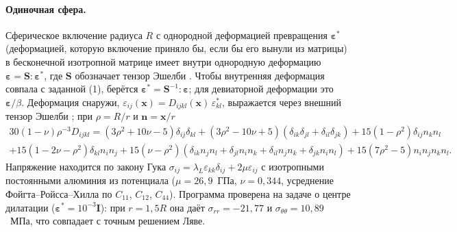 \documentclass[11pt,a4paper]{article}
\begin{document}
\paragraph{Одиночная сфера.} Сферическое включение радиуса $R$ с однородной
деформацией превращения $\boldsymbol\varepsilon^*$ (деформацией, которую
включение приняло бы, если бы его вынули из матрицы) в бесконечной изотропной
матрице имеет внутри однородную деформацию
$\boldsymbol\varepsilon=\mathbf S:\boldsymbol\varepsilon^*$, где
$\mathbf S$ обозначает тензор Эшелби \cite{Eshelby1957,Mura1987}. Чтобы внутренняя
деформация совпала с заданной (1), берётся
$\boldsymbol\varepsilon^*=\mathbf S^{-1}:\boldsymbol\varepsilon$;
для девиаторной деформации это $\boldsymbol\varepsilon/\beta$. Деформация
снаружи, $\varepsilon_{ij}(\mathbf x)=D_{ijkl}(\mathbf x)\,\varepsilon^*_{kl}$,
выражается через внешний тензор Эшелби \cite{JuSun1999}; при $\rho=R/r$
и $\mathbf n=\mathbf x/r$
\begin{multline}
30(1-\nu)\rho^{-3}D_{ijkl}=(3\rho^2+10\nu-5)\delta_{ij}\delta_{kl}
+(3\rho^2-10\nu+5)(\delta_{ik}\delta_{jl}+\delta_{il}\delta_{jk})
+15(1-\rho^2)\delta_{ij}n_kn_l\\
+15(1-2\nu-\rho^2)\delta_{kl}n_in_j
+15(\nu-\rho^2)(\delta_{ik}n_jn_l+\delta_{jl}n_in_k+\delta_{il}n_jn_k+\delta_{jk}n_in_l)
+15(7\rho^2-5)n_in_jn_kn_l .
\end{multline}
Напряжение находится по закону Гука
$\sigma_{ij}=\lambda_L\varepsilon_{kk}\delta_{ij}+2\mu\varepsilon_{ij}$
с изотропными постоянными алюминия из потенциала ($\mu=26{,}9$~ГПа,
$\nu=0{,}344$, усреднение Фойгта--Ройсса--Хилла по $C_{11}$, $C_{12}$,
$C_{44}$). Программа проверена на задаче о центре дилатации
($\boldsymbol\varepsilon^*=10^{-3}\mathbf I$): при $r=1{,}5R$ она даёт
$\sigma_{rr}=-21{,}77$ и $\sigma_{\theta\theta}=10{,}89$~МПа, что совпадает
с точным решением Ляве.
\end{document}
